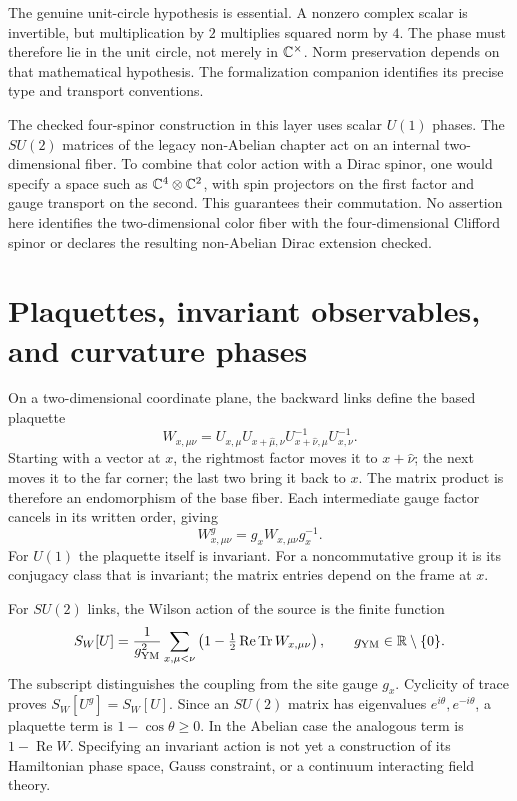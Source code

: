 The genuine unit-circle hypothesis is essential. A nonzero complex scalar is invertible, but multiplication by $2$ multiplies squared norm by $4$. The phase must therefore lie in the unit circle, not merely in $\mathbb C^\times$. Norm preservation depends on that mathematical hypothesis. The formalization companion identifies its precise type and transport conventions.

The checked four-spinor construction in this layer uses scalar $U(1)$ phases. The $SU(2)$ matrices of the legacy non-Abelian chapter act on an internal two-dimensional fiber. To combine that color action with a Dirac spinor, one would specify a space such as $\mathbb C^4\otimes\mathbb C^2$, with spin projectors on the first factor and gauge transport on the second. This guarantees their commutation. No assertion here identifies the two-dimensional color fiber with the four-dimensional Clifford spinor or declares the resulting non-Abelian Dirac extension checked.



\section{Plaquettes, invariant observables, and curvature phases}\label{g:plaquettes}

On a two-dimensional coordinate plane, the backward links define the based plaquette
\begin{equation}\label{g:plaquette}
 W_{x,\mu\nu}
 =U_{x,\mu}U_{x+\widehat\mu,\nu}
 U_{x+\widehat\nu,\mu}^{-1}U_{x,\nu}^{-1}.
\end{equation}
Starting with a vector at $x$, the rightmost factor moves it to $x+\widehat\nu$; the next moves it to the far corner; the last two bring it back to $x$. The matrix product is therefore an endomorphism of the base fiber. Each intermediate gauge factor cancels in its written order, giving
\begin{equation}\label{g:plaquette-covariance}
 W_{x,\mu\nu}^g=g_xW_{x,\mu\nu}g_x^{-1}.
\end{equation}
For $U(1)$ the plaquette itself is invariant. For a noncommutative group it is its conjugacy class that is invariant; the matrix entries depend on the frame at $x$.

For $SU(2)$ links, the Wilson action of the source is the finite function
\begin{equation}\label{g:wilson-action}
 S_W[U]=\frac1{g_{\mathrm{YM}}^2}
 \sum_{x,\mu<\nu}\left(1-\tfrac12\operatorname{Re}\operatorname{Tr}W_{x,\mu\nu}\right),
 \qquad g_{\mathrm{YM}}\in\mathbb R\setminus\{0\}.
\end{equation}
The subscript distinguishes the coupling from the site gauge $g_x$. Cyclicity of trace proves $S_W[U^g]=S_W[U]$. Since an $SU(2)$ matrix has eigenvalues $e^{i\theta},e^{-i\theta}$, a plaquette term is $1-\cos\theta\ge0$. In the Abelian case the analogous term is $1-\operatorname{Re}W$. Specifying an invariant action is not yet a construction of its Hamiltonian phase space, Gauss constraint, or a continuum interacting field theory.

